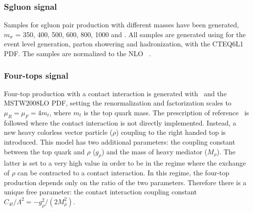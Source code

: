 
\subsubsection{Sgluon signal}
Samples for sgluon pair production with different masses have been generated, $m_{\sigma}$ = 350, 400, 500, 600, 800, 1000 and \unit[1250]{\gev}.
All samples are generated using  for the event level generation, parton showering and
hadronization, with the CTEQ6L1 PDF.
The samples are normalized to the NLO \xsec~\cite{GoncalvesNetto:2012nt}.


\subsubsection{Four-tops signal}
Four-top production with a contact interaction is generated with \madgraphfive\ and the MSTW2008LO PDF, setting the renormalization and factorization scales to $\mu_R = \mu_F = 4m_t$, where $m_t$ is the top quark mass.
The prescription of reference~\cite{Degrande:2010kt} is followed where the contact interaction is not directly implemented. 
Instead, a new heavy colorless vector particle
($\rho$) coupling to the right handed top is introduced. This model has two additional parameters: 
the coupling constant between the top quark and $\rho$ ($g_\rho$) and the mass of heavy mediator ($M_\rho$).
The latter is set to a very high value in order to be in the regime where the exchange of $\rho$ can be contracted to a contact interaction.
In this regime, the four-top production depends only on the ratio of the two parameters. Therefore there is a
unique free parameter: the contact interaction coupling constant $C_{4t}/\Lambda^2 = -g_\rho^2/(2M_\rho^2)$.

